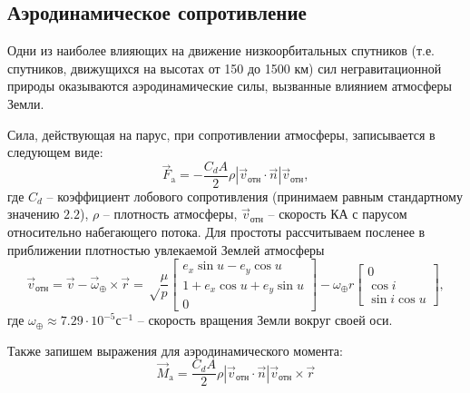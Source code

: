 \subsection{Аэродинамическое сопротивление}
\noindent\indent Одни из наиболее влияющих на движение низкоорбитальных спутников
(т.е. спутников, движущихся на высотах от 150 до 1500 км) сил негравитационной
природы оказываются аэродинамические силы, вызванные влиянием атмосферы Земли.\par
    Сила, действующая на парус, при сопротивлении атмосферы, записывается в
следующем виде:
\begin{equation}
    \vec{F}_{\text{a}} = -\frac{C_d A}{2}\rho|\vec{v}_{\text{отн}} \cdot \vec{n}| \vec{v}_{\text{отн}},
\end{equation}
где $C_d$ -- коэффициент лобового сопротивления (принимаем равным стандартному
значению $2.2$), $\rho$ -- плотность атмосферы, $\vec{v}_{\text{отн}}$ --
скорость КА с парусом относительно набегающего потока. Для простоты рассчитываем
посленее в приближении плотностью увлекаемой Землей атмосферы
\begin{equation}
    \vec{v}_{\text{отн}} = \vec{v} - \vec{\omega}_{\oplus} \times \vec{r} =
\sqrt\frac{\mu}{p}\begin{bmatrix}
           e_x\sin u - e_y\cos u \\
           1 + e_x\cos u + e_y\sin u \\
           0
         \end{bmatrix} - \omega_{\oplus}r\begin{bmatrix}
                    0 \\
                    \cos i \\
                    \sin i \cos u
                  \end{bmatrix},
\end{equation}
где $\omega_{\oplus} \approx 7.29\cdot 10^{-5} \text{с}^{-1}$ -- скорость вращения
Земли вокруг своей оси.\par
    Также запишем выражения для аэродинамического момента:
\begin{equation}
    \vec{M}_{\text{a}} = \frac{C_d A}{2}\rho|\vec{v}_{\text{отн}} \cdot \vec{n}| \vec{v}_{\text{отн}}\times\vec{r}
\end{equation}

